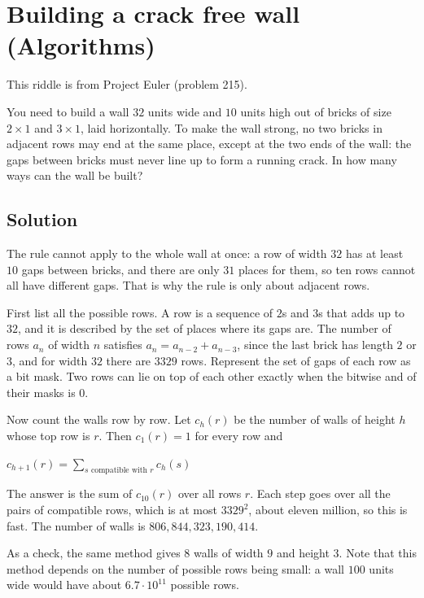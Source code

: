 \section {Building a crack free wall (Algorithms)}

This riddle is from Project Euler (problem 215).

You need to build a wall $32$ units wide and $10$ units high out of bricks of size $2 \times 1$ and $3 \times 1$, laid horizontally.
To make the wall strong, no two bricks in adjacent rows may end at the same place, except at the two ends of the wall:
the gaps between bricks must never line up to form a running crack.
In how many ways can the wall be built?

\subsection{Solution}

The rule cannot apply to the whole wall at once: a row of width $32$ has at least $10$ gaps between bricks,
and there are only $31$ places for them, so ten rows cannot all have different gaps. That is why the rule is only about adjacent rows.

First list all the possible rows. A row is a sequence of $2$s and $3$s that adds up to $32$, and it is described by the set of places where its gaps are.
The number of rows $a_n$ of width $n$ satisfies $a_n = a_{n-2} + a_{n-3}$, since the last brick has length $2$ or $3$, and for width $32$ there are $3329$ rows.
Represent the set of gaps of each row as a bit mask. Two rows can lie on top of each other exactly when the bitwise and of their masks is $0$.

Now count the walls row by row. Let $c_h(r)$ be the number of walls of height $h$ whose top row is $r$. Then $c_1(r) = 1$ for every row and
\begin{center}
$c_{h+1}(r) = \sum_{s \text{ compatible with } r} c_h(s)$
\end{center}
The answer is the sum of $c_{10}(r)$ over all rows $r$.
Each step goes over all the pairs of compatible rows, which is at most $3329^2$, about eleven million, so this is fast.
The number of walls is $806{,}844{,}323{,}190{,}414$.

As a check, the same method gives $8$ walls of width $9$ and height $3$.
Note that this method depends on the number of possible rows being small: a wall $100$ units wide would have about $6.7 \cdot 10^{11}$ possible rows.
